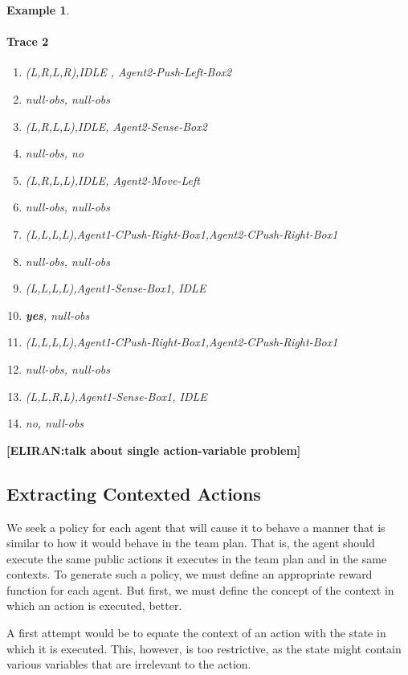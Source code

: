\documentclass[letterpaper]{article} %
\newtheorem{example}{Example}
\newcommand{\eliran}[1]{\textbf{[\color{red}ELIRAN:#1]}}
\begin{document}
\begin{example}
\paragraph{Trace 2}
\begin{enumerate}
    \item \emph{(L,R,L,R),IDLE , Agent2-Push-Left-Box2}
    \item \emph{null-obs, null-obs}
    \item \emph{(L,R,L,L),IDLE, Agent2-Sense-Box2}
    \item \emph{null-obs, no}
    \item \emph{(L,R,L,L),IDLE, Agent2-Move-Left}
    \item \emph{null-obs, null-obs}
    \item \emph{(L,L,L,L),Agent1-CPush-Right-Box1,Agent2-CPush-Right-Box1}
    \item \emph{null-obs, null-obs}
    \item \emph{(L,L,L,L),Agent1-Sense-Box1, IDLE}
    \item \emph{\textbf{yes}, null-obs}
    \item \emph{(L,L,L,L),Agent1-CPush-Right-Box1,Agent2-CPush-Right-Box1}
    \item \emph{null-obs, null-obs}
    \item \emph{(L,L,R,L),Agent1-Sense-Box1, IDLE}
    \item \emph{no, null-obs}
\end{enumerate}
\end{example}
\eliran{talk about single action-variable problem}


\subsection{Extracting Contexted Actions}
We seek a policy for each agent that will cause it to behave a manner that is similar to how it would behave in the team plan.
 That is, the agent should execute the same public actions it executes in the team plan and in the same contexts. To generate such a policy,
 we must define an appropriate reward function for each agent.
 But first, we must define the concept of the context in which an action is executed, better.

A first attempt would be to equate the context of an action with the
state in which it is executed. This, however, is too restrictive,
as the state might contain various variables that are irrelevant to the
action.
\end{document}
